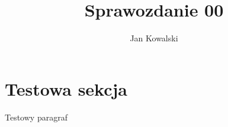 \documentclass{pczreport}
\title{Sprawozdanie 00}
\author{Jan Kowalski}
\begin{document}
    \maketitle

    \section{Testowa sekcja}
    Testowy paragraf
\end{document}

